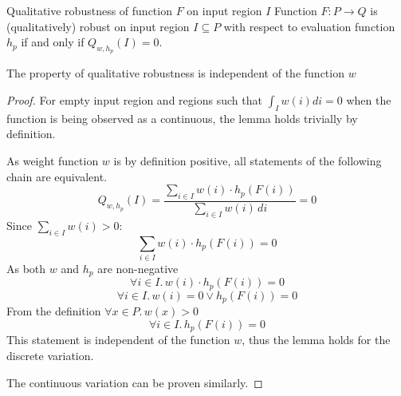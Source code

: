 \begin{definition}{Qualitative robustness of function $F$ on input region $I$}
    Function $F : P\to Q$ is (qualitatively) robust on input region $I\subseteq P$
    with respect to evaluation function $h_p$
    if and only if $Q_{w, h_p}(I) = 0$.
\end{definition}

\begin{lemma}{The property of qualitative robustness is independent of the function $w$}%
    \label{lemma:robustness_independence_of_weight}
    \begin{proof}
        For empty input region and regions such that $\int_I w(i) di = 0$
        when the function is being observed as a continuous,
        the lemma holds trivially by definition.

        As weight function $w$ is by definition positive,
        all statements of the following chain are equivalent.
        \begin{equation*}
            Q_{w, h_p}(I) = \frac{\sum_{i\in I} w(i)\cdot h_p(F(i))}{\sum_{i\in I} w(i) \, di} = 0
        \end{equation*}
        Since $\sum_{i\in I} w(i) > 0$:
        \begin{equation*}
            \sum_{i\in I} w(i)\cdot h_p(F(i)) = 0
        \end{equation*}
        As both $w$ and $h_p$ are non-negative
        \begin{equation*}
            \forall i\in I. \, w(i)\cdot h_p(F(i)) = 0
        \end{equation*}
        \begin{equation*}
            \forall i\in I. \, w(i) = 0 \vee h_p(F(i)) = 0
        \end{equation*}
        From the definition $\forall x\in P.\, w(x) > 0$
        \begin{equation*}
            \forall i\in I. \, h_p(F(i)) = 0
        \end{equation*}
        This statement is independent of the function $w$,
        thus the lemma holds for the discrete variation.

        The continuous variation can be proven similarly.
    \end{proof}
\end{lemma}

